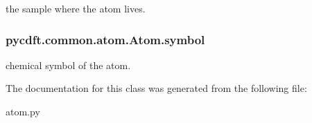the sample where the atom lives. 

\hypertarget{classpycdft_1_1common_1_1atom_1_1Atom_a9ecd2653f6b1a9d6c3cbc7cea0db4002}{
\subsubsection[{symbol}]{\setlength{\rightskip}{0pt plus 5cm}pycdft.\-common.\-atom.\-Atom.\-symbol}}\label{classpycdft_1_1common_1_1atom_1_1Atom_a9ecd2653f6b1a9d6c3cbc7cea0db4002}


chemical symbol of the atom. 



The documentation for this class was generated from the following file\-:\begin{DoxyCompactItemize}
\item 
atom.\-py\end{DoxyCompactItemize}
